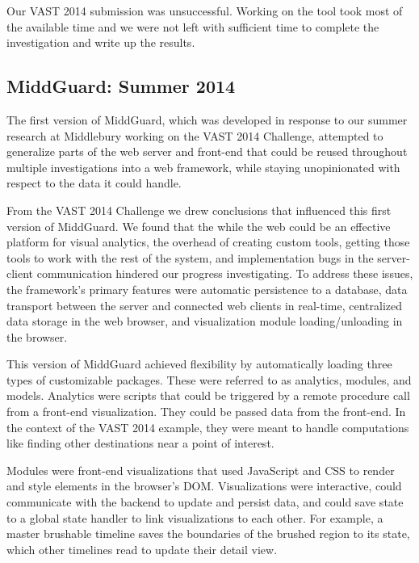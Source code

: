 \documentclass[midd]{thesis}
\begin{document}
Our VAST 2014 submission was unsuccessful. Working on the tool took most of the
available time and we were not left with sufficient time to complete the
investigation and write up the results.

\subsection{MiddGuard: Summer 2014}

The first version of MiddGuard, which was developed in response to our summer
research at Middlebury working on the VAST 2014 Challenge, attempted to
generalize parts of the web server and front-end that could be reused throughout
multiple investigations into a web framework, while staying unopinionated with
respect to the data it could handle.

From the VAST 2014 Challenge we drew conclusions that influenced this first
version of MiddGuard. We found that the while the web could be an effective
platform for visual analytics, the overhead of creating custom tools, getting
those tools to work with the rest of the system, and implementation bugs in the
server-client communication hindered our progress investigating. To address
these issues, the framework's primary features were automatic persistence to a
database, data transport between the server and connected web clients in
real-time, centralized data storage in the web browser, and visualization module
loading/unloading in the browser.

This version of MiddGuard achieved flexibility by automatically loading three
types of customizable packages. These were referred to as analytics, modules,
and models. Analytics were scripts that could be triggered by a remote procedure
call from a front-end visualization. They could be passed data from the
front-end. In the context of the VAST 2014 example, they were meant to handle
computations like finding other destinations near a point of interest.

Modules were front-end visualizations that used JavaScript and CSS to render and
style elements in the browser's DOM. Visualizations were interactive, could
communicate with the backend to update and persist data, and could save state to
a global state handler to link visualizations to each other. For example, a
master brushable timeline saves the boundaries of the brushed region to its
state, which other timelines read to update their detail view.
\end{document}
